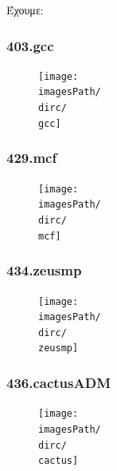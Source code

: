 \documentclass[12pt,a4paper]{article}
\newcommand{\imagesPath}{/home/nick/arch-ntua/ex02/graphs}
\newcommand{\gcc}{403.gcc.cslab_branch_predictors.out.pdf}
\newcommand{\mcf}{429.mcf.cslab_branch_predictors.out.pdf}
\newcommand{\zeusmp}{434.zeusmp.cslab_branch_predictors.out.pdf}
\newcommand{\cactus}{436.cactusADM.cslab_branch_predictors.out.pdf}
\newcommand{\dirc}{4.3}
\begin{document}
			Έχουμε:
			
			\subsubsection{403.gcc}
				\begin{figure}[H]
					\begin{center}
						 \texttt{[image: \\imagesPath/\\dirc/\\gcc]}
					\end{center}
				\end{figure}
			
			\subsubsection{429.mcf}
				\begin{figure}[H]
					\begin{center}
						 \texttt{[image: \\imagesPath/\\dirc/\\mcf]}
					\end{center}
				\end{figure}
			
			\subsubsection{434.zeusmp}
				\begin{figure}[H]
					\begin{center}
						 \texttt{[image: \\imagesPath/\\dirc/\\zeusmp]}
					\end{center}
				\end{figure}
			
			\subsubsection{436.cactusADM}
				\begin{figure}[H]
					\begin{center}
						 \texttt{[image: \\imagesPath/\\dirc/\\cactus]}
					\end{center}
				\end{figure}
			
\end{document}
